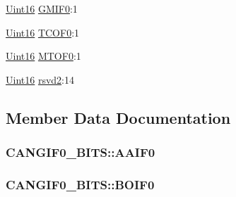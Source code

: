 \begin{DoxyCompactItemize}
\item 
\hyperlink{_d_s_p2833x___device_8h_a59a9f6be4562c327cbfb4f7e8e18f08b}{Uint16} \hyperlink{struct_c_a_n_g_i_f0___b_i_t_s_a2617d92f3680651b193a4d1fcbee5325}{G\+M\+I\+F0}\+:1
\item 
\hyperlink{_d_s_p2833x___device_8h_a59a9f6be4562c327cbfb4f7e8e18f08b}{Uint16} \hyperlink{struct_c_a_n_g_i_f0___b_i_t_s_a725b27504affbdf71275f380c43051e3}{T\+C\+O\+F0}\+:1
\item 
\hyperlink{_d_s_p2833x___device_8h_a59a9f6be4562c327cbfb4f7e8e18f08b}{Uint16} \hyperlink{struct_c_a_n_g_i_f0___b_i_t_s_aa45cfe767c5edaa369493a346f71b0bd}{M\+T\+O\+F0}\+:1
\item 
\hyperlink{_d_s_p2833x___device_8h_a59a9f6be4562c327cbfb4f7e8e18f08b}{Uint16} \hyperlink{struct_c_a_n_g_i_f0___b_i_t_s_a7b0969d6d88eff14fb0c0964e118cf02}{rsvd2}\+:14
\end{DoxyCompactItemize}


\subsection{Member Data Documentation}
\hypertarget{struct_c_a_n_g_i_f0___b_i_t_s_a11513792cdfbd4f39c7162ff280e2663}{}
\subsubsection[{A\+A\+I\+F0}]{ C\+A\+N\+G\+I\+F0\+\_\+\+B\+I\+T\+S\+::\+A\+A\+I\+F0}\label{struct_c_a_n_g_i_f0___b_i_t_s_a11513792cdfbd4f39c7162ff280e2663}
\hypertarget{struct_c_a_n_g_i_f0___b_i_t_s_a837570293461b56fbe6c47e1aa45a183}{}
\subsubsection[{B\+O\+I\+F0}]{ C\+A\+N\+G\+I\+F0\+\_\+\+B\+I\+T\+S\+::\+B\+O\+I\+F0}\label{struct_c_a_n_g_i_f0___b_i_t_s_a837570293461b56fbe6c47e1aa45a183}
\hypertarget{struct_c_a_n_g_i_f0___b_i_t_s_a4430a81a0101f30db82158b87d99ddce}{}
